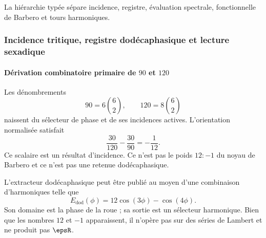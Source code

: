 \noindent La hiérarchie typée sépare incidence, registre, évaluation spectrale, fonctionnelle de Barbero et tours harmoniques.\par\medskip

\subsubsection{Incidence tritique, registre dodécaphasique et lecture sexadique}

\paragraph{Dérivation combinatoire primaire de \(90\) et \(120\)}

Les dénombrements
\[
90=6\binom62,
\qquad
120=8\binom62
\]
naissent du sélecteur de phase et de ses incidences actives. L'orientation
normalisée satisfait
\begin{equation}
\frac{30}{120}-\frac{30}{90}=-\frac1{12}.
\label{eq:minus-one-twelve}
\end{equation}
Ce scalaire est un résultat d'incidence. Ce n'est pas le poids \(12:-1\) du
noyau de Barbero et ce n'est pas une retenue dodécaphasique.

L'extracteur dodécaphasique peut être publié au moyen d'une combinaison
d'harmoniques telle que
\[
E_{\mathrm{dod}}(\phi)=12\cos(3\phi)-\cos(4\phi).
\]
Son domaine est la phase de la roue ; sa sortie est un sélecteur harmonique. Bien que
les nombres \(12\) et \(-1\) apparaissent, il n'opère pas sur des séries de Lambert et ne
produit pas \(\epsR\).

